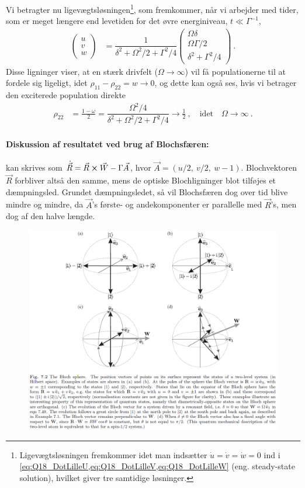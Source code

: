 Vi betragter nu ligevægtsløsningen\footnote{Ligevægtsløsningen fremkommer idet man indsætter $\Dot{u} = \Dot{v} = \Dot{w} = 0$ ind i \cref{eq:Q18_DotLilleU,eq:Q18_DotLilleV,eq:Q18_DotLilleW} (eng. steady-state solution), hvilket giver tre samtidige løsninger.}, som fremkommer, når vi arbejder med tider, som er meget længere end levetiden for det øvre energiniveau, $t \ll \Gamma^{-1}$,
\begin{align}
    \begin{pmatrix}
        u \\
        v \\
        w
    \end{pmatrix}
    &= \dfrac{1}{\delta^2 + \Omega^2 / 2 + \Gamma^2 / 4}
        \begin{pmatrix}
            \Omega\delta \\
            \Omega\Gamma/2 \\
            \delta^2 + \Gamma^2 / 4
        \end{pmatrix}
        \: .
\end{align}
Disse ligninger viser, at en stærk drivfelt ($\Omega \rightarrow \infty$) vil få populationerne til at fordele sig ligeligt, idet $\rho_{11} - \rho_{22} = w \rightarrow 0$, og dette kan også ses, hvis vi betrager den exciterede population direkte
\begin{align}
    \rho_{22} &= \frac{1 - \omega}{2} = \dfrac{\Omega^2 / 4}{\delta^2 + \Omega^2 / 2 + \Gamma^2 / 4} \rightarrow \frac{1}{2} \: , \quad \text{idet} \quad \Omega \rightarrow \infty \: .
\end{align}


\paragraph{Diskussion af resultatet ved brug af Blochsfæren:}  kan skrives som $\Dot{\Vec{R}} = \Vec{R} \cross \Vec{W} - \Gamma \Vec{A}$, hvor $\Vec{A} = (u/2,\: v/2,\: w - 1)$. Blochvektoren $\Vec{R}$ forbliver altså den samme, mens de optiske Blochligninger blot tilføjes et dæmpningsled. Grundet dæmpningsledet, så vil Blochsfæren dog over tid blive mindre og mindre, da $\Vec{A}$'s første- og andekomponenter er parallelle med $\Vec{R}$'s, men dog af den halve længde.

\begin{figure}[!h]
    \centering
    \includegraphics[width=\textwidth]{Q18/images/BlochSphere.PNG}
    \caption{}
    \label{fig:Q18_BlochSphere}
\end{figure}